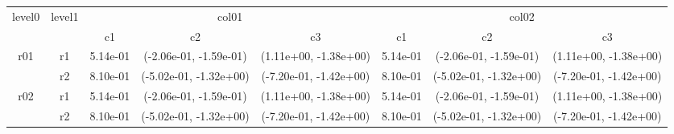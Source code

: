\begin{tabular}{cccccccc}
\toprule
\multirow{2}{*}{level0} & \multirow{2}{*}{level1}&\multicolumn{3}{c}{col01}&\multicolumn{3}{c}{col02}\tabularnewline
\cmidrule(lr){3-5}
\cmidrule(lr){6-8}
&&c1&c2&c3&c1&c2&c3\tabularnewline
\midrule
\midrule
\multirow{2}{*}{r01}&r1&5.14e-01& (-2.06e-01, -1.59e-01)& (1.11e+00, -1.38e+00)&5.14e-01& (-2.06e-01, -1.59e-01)& (1.11e+00, -1.38e+00)\tabularnewline
&r2&8.10e-01& (-5.02e-01, -1.32e+00)& (-7.20e-01, -1.42e+00)&8.10e-01& (-5.02e-01, -1.32e+00)& (-7.20e-01, -1.42e+00)\tabularnewline
\midrule
\multirow{2}{*}{r02}&r1&5.14e-01& (-2.06e-01, -1.59e-01)& (1.11e+00, -1.38e+00)&5.14e-01& (-2.06e-01, -1.59e-01)& (1.11e+00, -1.38e+00)\tabularnewline
&r2&8.10e-01& (-5.02e-01, -1.32e+00)& (-7.20e-01, -1.42e+00)&8.10e-01& (-5.02e-01, -1.32e+00)& (-7.20e-01, -1.42e+00)\tabularnewline
\bottomrule
\end{tabular}
